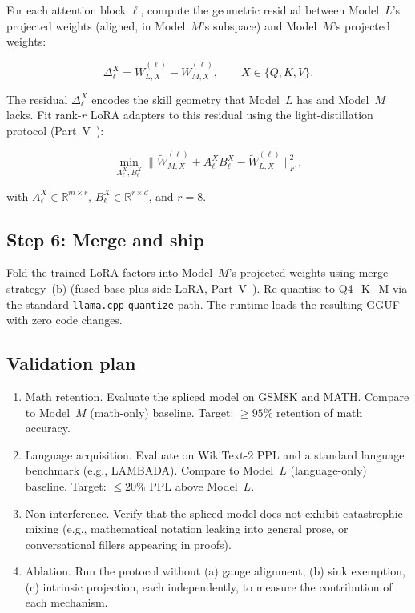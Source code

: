 \documentclass[11pt]{article}
\begin{document}
For each attention block $\ell$, compute the geometric residual
between Model~$L$'s projected weights (aligned, in Model~$M$'s
subspace) and Model~$M$'s projected weights:

\begin{equation}
\Delta_\ell^X = \tilde W_{L,X}^{(\ell)} - \tilde W_{M,X}^{(\ell)},
\qquad X \in \{Q,K,V\}.
\label{eq:residual}
\end{equation}

The residual $\Delta_\ell^X$ encodes the skill geometry that Model~$L$
has and Model~$M$ lacks.  Fit rank-$r$ LoRA adapters to this residual
using the light-distillation protocol (Part~V~\cite{stewart2026distill}):

\begin{equation}
\min_{A_\ell^X, B_\ell^X} \|\tilde W_{M,X}^{(\ell)} + A_\ell^X B_\ell^X -
\tilde W_{L,X}^{(\ell)}\|_F^2,
\label{eq:lora-fit}
\end{equation}

with $A_\ell^X \in \mathbb{R}^{m \times r}$, $B_\ell^X \in
\mathbb{R}^{r \times d}$, and $r=8$.

\subsection{Step 6: Merge and ship}

Fold the trained LoRA factors into Model~$M$'s projected weights using
merge strategy~(b) (fused-base plus side-LoRA, Part~V~\cite{stewart2026distill}).
Re-quantise to Q4\_K\_M via the standard \texttt{llama.cpp}
\texttt{quantize} path.  The runtime loads the resulting GGUF with zero
code changes.

\subsection{Validation plan}

\begin{enumerate}
\item Math retention.  Evaluate the spliced model on GSM8K
      and MATH.  Compare to Model~$M$ (math-only) baseline.  Target:
      ${\ge}95\%$ retention of math accuracy.

\item Language acquisition.  Evaluate on WikiText-2 PPL and
      a standard language benchmark (e.g., LAMBADA).  Compare to
      Model~$L$ (language-only) baseline.  Target: ${\le}20\%$ PPL
      above Model~$L$.

\item Non-interference.  Verify that the spliced model does
      not exhibit catastrophic mixing (e.g., mathematical notation
      leaking into general prose, or conversational fillers appearing
      in proofs).

\item Ablation.  Run the protocol without (a) gauge alignment,
      (b) sink exemption, (c) intrinsic projection, each independently, to measure the contribution of each mechanism.
\end{enumerate}
\end{document}

